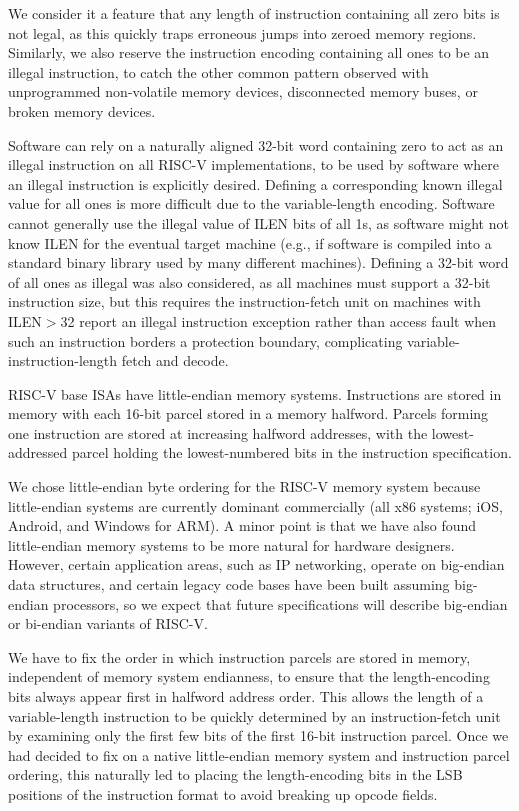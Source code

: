 \begin{commentary}
We consider it a feature that any length of instruction containing all
zero bits is not legal, as this quickly traps erroneous jumps into
zeroed memory regions. Similarly, we also reserve the instruction
encoding containing all ones to be an illegal instruction, to catch
the other common pattern observed with unprogrammed non-volatile
memory devices, disconnected memory buses, or broken memory devices.

Software can rely on a naturally aligned 32-bit word containing zero
to act as an illegal instruction on all RISC-V implementations, to be
used by software where an illegal instruction is explicitly desired.
Defining a corresponding known illegal value for all ones is more
difficult due to the variable-length encoding.  Software cannot
generally use the illegal value of ILEN bits of all 1s, as software
might not know ILEN for the eventual target machine (e.g., if software
is compiled into a standard binary library used by many different
machines).  Defining a 32-bit word of all ones as illegal was also
considered, as all machines must support a 32-bit instruction size,
but this requires the instruction-fetch unit on machines with
ILEN$>$32 report an illegal instruction exception rather than access
fault when such an instruction borders a protection boundary,
complicating variable-instruction-length fetch and decode.
\end{commentary}

RISC-V base ISAs have little-endian memory systems.  Instructions are
stored in memory with each 16-bit parcel stored in a memory
halfword.  Parcels forming one instruction are stored at increasing
halfword addresses, with the lowest-addressed parcel holding the
lowest-numbered bits in the instruction specification.

\begin{commentary}
We chose little-endian byte ordering for the RISC-V memory system
because little-endian systems are currently dominant commercially (all
x86 systems; iOS, Android, and Windows for ARM).  A minor point is
that we have also found little-endian memory systems to be more
natural for hardware designers.  However, certain application areas,
such as IP networking, operate on big-endian data structures, and
certain legacy code bases have been built assuming big-endian
processors, so we expect that future specifications will describe
big-endian or bi-endian variants of RISC-V.

We have to fix the order in which instruction parcels are stored in
memory, independent of memory system endianness, to ensure that the
length-encoding bits always appear first in halfword address
order. This allows the length of a variable-length instruction to be
quickly determined by an instruction-fetch unit by examining only the
first few bits of the first 16-bit instruction parcel.  Once we had
decided to fix on a native little-endian memory system and instruction
parcel ordering, this naturally led to placing the length-encoding
bits in the LSB positions of the instruction format to avoid breaking
up opcode fields.
\end{commentary}

